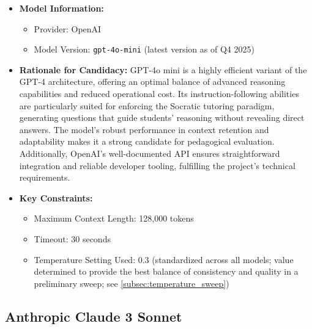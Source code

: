 \begin{itemize}
    \item \textbf{Model Information:} 
        \begin{itemize}
            \item Provider: OpenAI
            \item Model Version: \verb|gpt-4o-mini| (latest version as of Q4 2025)
        \end{itemize}
    \item \textbf{Rationale for Candidacy:} 
        GPT-4o mini is a highly efficient variant of the GPT-4 architecture, offering an optimal balance of advanced reasoning capabilities and reduced operational cost. Its instruction-following abilities are particularly suited for enforcing the Socratic tutoring paradigm, generating questions that guide students' reasoning without revealing direct answers. The model's robust performance in context retention and adaptability makes it a strong candidate for pedagogical evaluation. Additionally, OpenAI's well-documented API ensures straightforward integration and reliable developer tooling, fulfilling the project's technical requirements.
    \item \textbf{Key Constraints:}
        \begin{itemize}
            \item Maximum Context Length: 128,000 tokens
            \item Timeout: 30 seconds
            \item Temperature Setting Used: 0.3 (standardized across all models; value determined to provide the best balance of consistency and quality in a preliminary sweep; see \cref{subsec:temperature_sweep})
        \end{itemize}
\end{itemize}

\subsection{Anthropic Claude 3 Sonnet}
\label{sec:model_claude3_sonnet}

